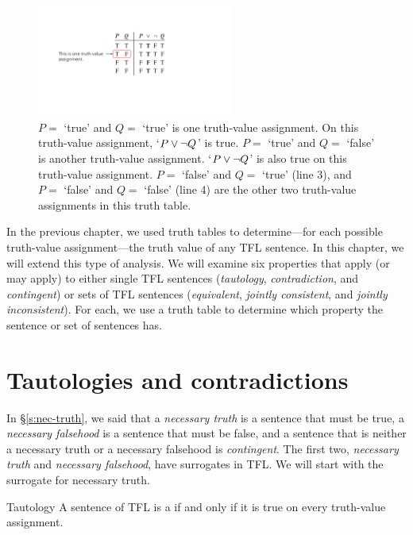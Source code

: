 \begin{figure}
\centering
\includegraphics[width=6.5cm]{this_is_a_valuation.pdf}
\caption{$P =$ `true' and $Q =$ `true' is one truth-value assignment. On this truth-value assignment, `$P \vee {\neg} Q$' is true. $P =$ `true' and $Q =$ `false' is another truth-value assignment. `$P \vee {\neg} Q$' is also true on this truth-value assignment. $P =$ `false' and $Q =$ `true' (line 3), and $P =$ `false' and $Q =$ `false' (line 4) are the other two truth-value assignments in this truth table.}
\label{fig:truth-value assignment}
\end{figure}


In the previous chapter, we used truth tables to determine---for each possible truth-value assignment---the truth value of any TFL sentence. In this chapter, we will extend this type of analysis. We will examine six properties that apply (or may apply) to either single TFL sentences (\textit{tautology}, \textit{contradiction}, and \textit{contingent}) or sets of TFL sentences (\textit{equivalent}, \textit{jointly consistent}, and \textit{jointly inconsistent}). For each, we use a truth table to determine which property the sentence or set of sentences has.


\section{Tautologies and contradictions}
In \S\ref{s:nec-truth}, we said that a \emph{necessary truth} is a sentence that must be true, a \emph{necessary falsehood} is a sentence that must be false, and a sentence that is neither a necessary truth or a necessary falsehood is \textit{contingent}. The first two, \textit{necessary truth} and \textit{necessary falsehood}, have surrogates in TFL. We will start with the surrogate for necessary truth.

\begin{factboxy}{Tautology}
A sentence of TFL is a  if and only if it is true on every truth-value assignment.
\end{factboxy}

